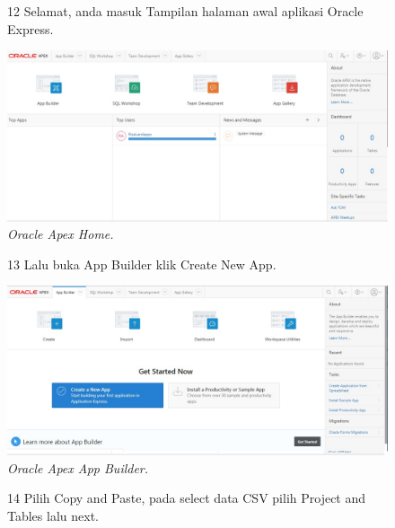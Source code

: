 \begin{enumerate}
\begin{figure}
\item[12] Selamat, anda masuk Tampilan halaman awal aplikasi Oracle Express.

    \begin{center}
\includegraphics[scale=0.4]{figures/login1.jpg}
    \caption{\textit{Oracle Apex Home.}}
        \end{center}
\label{gambar}
\end{figure}

\begin{figure}
\item[13] Lalu buka App Builder klik Create New App.

    \begin{center}
\includegraphics[scale=0.4]{figures/login2.jpg}
    \caption{\textit{Oracle Apex App Builder.}}
        \end{center}
\label{gambar}
\end{figure}

\begin{figure}
\item[14] Pilih Copy and Paste, pada select data CSV pilih Project and Tables lalu next.


\end{figure}
\end{enumerate}
